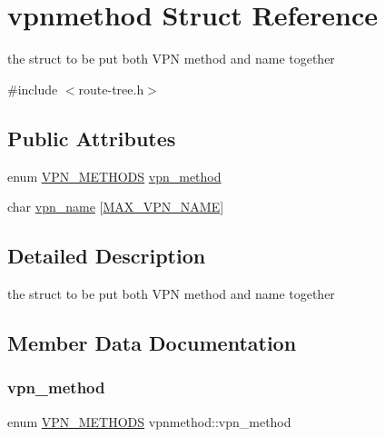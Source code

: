 \hypertarget{structvpnmethod}{}\section{vpnmethod Struct Reference}
\label{structvpnmethod}


the struct to be put both V\+PN method and name together  




{\ttfamily \#include $<$route-\/tree.\+h$>$}

\subsection*{Public Attributes}
\begin{DoxyCompactItemize}
\item 
enum \hyperlink{route-tree_8h_a5b876670828c4e38106ba1c6d91024b7}{V\+P\+N\+\_\+\+M\+E\+T\+H\+O\+DS} \hyperlink{structvpnmethod_a33fa9abeccb46523aba83364fc44990f}{vpn\+\_\+method}
\item 
char \hyperlink{structvpnmethod_ac221598ca4c95900ae5b9fa404cbdb4d}{vpn\+\_\+name} \mbox{[}\hyperlink{route-tree_8h_a77ed9a5f9670b7a2d69c376d1199eddf}{M\+A\+X\+\_\+\+V\+P\+N\+\_\+\+N\+A\+ME}\mbox{]}
\end{DoxyCompactItemize}


\subsection{Detailed Description}
the struct to be put both V\+PN method and name together 

\subsection{Member Data Documentation}
\mbox{\label{structvpnmethod_a33fa9abeccb46523aba83364fc44990f}} 
\subsubsection{\texorpdfstring{vpn\+\_\+method}{vpn\_method}}
{\footnotesize\ttfamily enum \hyperlink{route-tree_8h_a5b876670828c4e38106ba1c6d91024b7}{V\+P\+N\+\_\+\+M\+E\+T\+H\+O\+DS} vpnmethod\+::vpn\+\_\+method}

\mbox{\label{structvpnmethod_ac221598ca4c95900ae5b9fa404cbdb4d}} 
